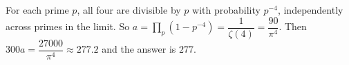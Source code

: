 For each prime $p$, all four are divisible by $p$ with probability $p^{-4}$, independently across primes in the limit. So $a=\prod_p(1-p^{-4})=\dfrac1{\zeta(4)}=\dfrac{90}{\pi^4}$. Then $300a=\dfrac{27000}{\pi^4}\approx277.2$ and the answer is $\boxed{277}$.
